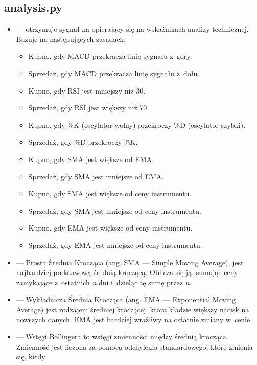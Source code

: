 \documentclass[12pt]{article}
\begin{document}
    \subsection{analysis.py}\label{subsec:wskazniki}
    \begin{itemize}
        \item {} — otrzymuje sygnał na opierający się na wskaźnikach analizy technicznej.
        Bazuje na następujących zasadach:
        \begin{itemize}
            \item Kupno, gdy MACD przekracza linię sygnału z~góry.
            \item Sprzedaż, gdy MACD przekracza linię sygnału z~dołu.
            \item Kupno, gdy RSI jest mniejszy niż 30.
            \item Sprzedaż, gdy RSI jest większy niż 70.
            \item Kupno, gdy \%K (oscylator wolny) przekroczy \%D (oscylator szybki).
            \item Sprzedaż, gdy \%D przekroczy \%K\@.
            \item Kupno, gdy SMA jest większe od EMA\@.
            \item Sprzedaż, gdy SMA jest mniejsze od EMA\@.
            \item Kupno, gdy SMA jest większe od ceny instrumentu.
            \item Sprzedaż, gdy SMA jest mniejsze od ceny instrumentu.
            \item Kupno, gdy EMA jest większe od ceny instrumentu.
            \item Sprzedaż, gdy EMA jest mniejsze od ceny instrumentu.
        \end{itemize}
        \item {} — Prosta Średnia Krocząca (ang. SMA — Simple Moving Average), jest
        najbardziej podstawową średnią kroczącą.
        Oblicza się ją, sumując ceny zamykające z~ostatnich \textit{n} dni i~dzieląc tę sumę przez \textit{n}.
        \item {} — Wykładnicza Średnia Krocząca (ang. EMA — Exponential Moving Average) jest rodzajem
        średniej kroczącej, która kładzie większy nacisk na nowszych danych.
        EMA jest bardziej wrażliwy na ostatnie zmiany w~cenie.
        \item {} — Wstęgi Bollingera to wstęgi zmienności między średnią krocząca.
        Zmienność jest liczona za pomocą odchylenia standardowego, które zmienia się, kiedy

\end{itemize}
\end{document}
